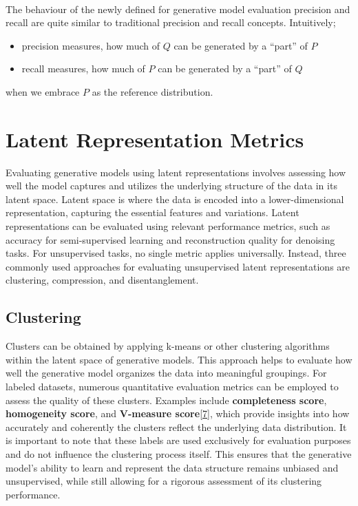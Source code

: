 \documentclass{article}
\begin{document}
    \paragraph{}
    The behaviour of the newly defined for generative model evaluation precision and recall are quite similar to traditional precision and recall concepts. Intuitively;
    \begin{itemize}
        \item precision measures, how much of $Q$ can be generated by a “part” of $P$
        \item recall measures, how much of $P$ can be generated by a “part” of $Q$
    \end{itemize}
    when we embrace $P$ as the reference distribution.
    
\section{Latent Representation Metrics}
    Evaluating generative models using latent representations involves assessing how well the model captures and utilizes the underlying structure of the data in its latent space. Latent space is where the data is encoded into a lower-dimensional representation, capturing the essential features and variations.
    Latent representations can be evaluated using relevant performance metrics, such as accuracy for semi-supervised learning and reconstruction quality for denoising tasks. For unsupervised tasks, no single metric applies universally. Instead, three commonly used approaches for evaluating unsupervised latent representations are clustering, compression, and disentanglement. 
    \subsection{Clustering}
    
Clusters can be obtained by applying k-means or other clustering algorithms within the latent space of generative models. This approach helps to evaluate how well the generative model organizes the data into meaningful groupings. For labeled datasets, numerous quantitative evaluation metrics can be employed to assess the quality of these clusters. Examples include \textbf{completeness score}, \textbf{homogeneity score}, and \textbf{V-measure score}\hyperref[sec: ref7]{[7]}, which provide insights into how accurately and coherently the clusters reflect the underlying data distribution. It is important to note that these labels are used exclusively for evaluation purposes and do not influence the clustering process itself. This ensures that the generative model's ability to learn and represent the data structure remains unbiased and unsupervised, while still allowing for a rigorous assessment of its clustering performance.  
    
\end{document}
